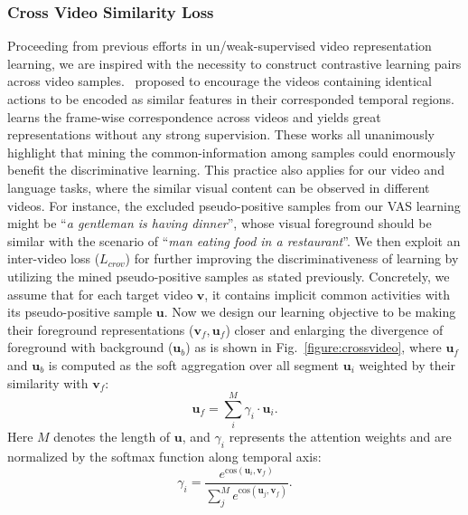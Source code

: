 \subsubsection{Cross Video Similarity Loss}
Proceeding from previous efforts in un/weak-supervised video representation learning, we are inspired with the necessity to construct contrastive learning pairs across video samples.~\citep{paul2018w} proposed to encourage the videos containing identical actions to be encoded as similar features in their corresponded temporal regions.~\citep{dwibedi2019temporal} learns the frame-wise correspondence across videos and yields great representations without any strong supervision. These works all unanimously highlight that mining the common-information among samples could enormously benefit the discriminative learning. This practice also applies for our video and language tasks, where the similar visual content can be observed in different videos. For instance, the excluded pseudo-positive samples from our VAS learning might be ``\textit{a gentleman is having dinner}'', whose visual foreground should be similar with the scenario of ``\textit{man eating food in a restaurant}''. We then exploit an inter-video loss ($L_{crov}$) for further improving the discriminativeness of learning by utilizing the mined pseudo-positive samples as stated previously. Concretely, we assume that for each target video $\boldsymbol{v}$, it contains implicit common activities with its pseudo-positive sample $\boldsymbol{u}$. Now we design our learning objective to be making their foreground representations ($\boldsymbol{v}_f, \boldsymbol{u}_f$) closer and enlarging the divergence of foreground with background ($\boldsymbol{u}_b$) as is shown in Fig.~\ref{figure:crossvideo}, where $\boldsymbol{u}_f$ and $\boldsymbol{u}_b$ is computed as the soft aggregation over all segment $\boldsymbol{u}_i$ weighted by their similarity with $\boldsymbol{v}_f$: 
\begin{equation}
    \boldsymbol{u}_f = \sum_{i}^{M} \gamma_i \cdot  \boldsymbol{u}_i.
\end{equation}
Here $M$ denotes the length of $\boldsymbol{u}$, and $\gamma_i$ represents the attention weights and are normalized by the softmax function along temporal axis:
\begin{equation}
    \gamma_i = \frac{e^{\text{cos}(\boldsymbol{u}_i, \boldsymbol{v}_f)}}{\sum_{j}^{M}e^{\text{cos}(\boldsymbol{u}_j, \boldsymbol{v}_f)}}.
\end{equation}
